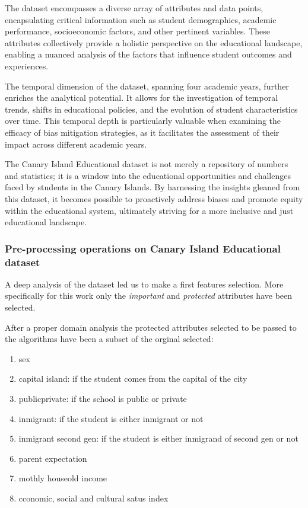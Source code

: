 \documentclass[12pt,a4paper,openright,twoside]{book}
\begin{document}
The dataset encompasses a diverse array of attributes and data points, encapsulating critical information such as student demographics, academic performance, socioeconomic factors, and other pertinent variables. These attributes collectively provide a holistic perspective on the educational landscape, enabling a nuanced analysis of the factors that influence student outcomes and experiences. 

The temporal dimension of the dataset, spanning four academic years, further enriches the analytical potential. It allows for the investigation of temporal trends, shifts in educational policies, and the evolution of student characteristics over time. This temporal depth is particularly valuable when examining the efficacy of bias mitigation strategies, as it facilitates the assessment of their impact across different academic years. 

The Canary Island Educational dataset is not merely a repository of numbers and statistics; it is a window into the educational opportunities and challenges faced by students in the Canary Islands. By harnessing the insights gleaned from this dataset, it becomes possible to proactively address biases and promote equity within the educational system, ultimately striving for a more inclusive and just educational landscape.

\subsubsection{Pre-processing operations on Canary Island Educational dataset}

A deep analysis of the dataset led us to make a first features selection. More specifically for this work only the \emph{important} and \emph{protected} attributes have been selected.

After a proper domain analysis the protected attributes selected to be passed to the algorithms have been a subset of the orginal selected:

\begin{enumerate}

    \item sex

    \item capital island: if the student comes from the capital of the city

    \item public\textunderscore private: if the school is public or private

    \item inmigrant: if the student is either inmigrant or not

    \item inmigrant second gen: if the student is either inmigrand of second gen or not

    \item parent expectation
    
    \item mothly houseold income

    \item cconomic, social and cultural satus index

\end{enumerate}
\end{document}
